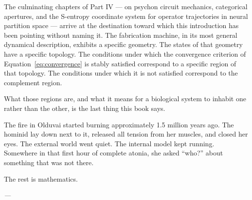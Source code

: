 The culminating chapters of Part IV --- on psychon circuit mechanics, categorical apertures, and the S-entropy coordinate system for operator trajectories in neural partition space --- arrive at the destination toward which this introduction has been pointing without naming it. The fabrication machine, in its most general dynamical description, exhibits a specific geometry. The states of that geometry have a specific topology. The conditions under which the convergence criterion of Equation~\eqref{eq:convergence} is stably satisfied correspond to a specific region of that topology. The conditions under which it is not satisfied correspond to the complement region.

What those regions are, and what it means for a biological system to inhabit one rather than the other, is the last thing this book says.

\bigskip

\noindent The fire in Olduvai started burning approximately 1.5 million years ago. The hominid lay down next to it, released all tension from her muscles, and closed her eyes. The external world went quiet. The internal model kept running. Somewhere in that first hour of complete atonia, she asked ``who?'' about something that was not there.

\noindent The rest is mathematics.

\vspace{3em}

\begin{flushright}
\textit{---}
\end{flushright}
